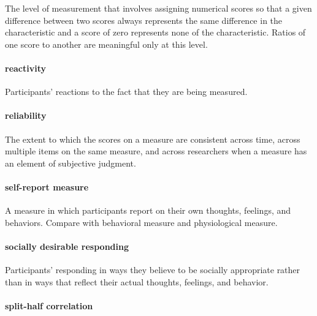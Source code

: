 \documentclass[
]{krantz}
\begin{document}
The level of measurement that involves assigning numerical scores so that a given difference between two scores always represents the same difference in the characteristic and a score of zero represents none of the characteristic. Ratios of one score to another are meaningful only at this level.

\paragraph*{reactivity}\label{reactivity}

Participants' reactions to the fact that they are being measured.

\paragraph*{reliability}\label{reliability-1}

The extent to which the scores on a measure are consistent across time, across multiple items on the same measure, and across researchers when a measure has an element of subjective judgment.

\paragraph*{self-report measure}\label{self-report-measure}

A measure in which participants report on their own thoughts, feelings, and behaviors. Compare with behavioral measure and physiological measure.

\paragraph*{socially desirable responding}\label{socially-desirable-responding}

Participants' responding in ways they believe to be socially appropriate rather than in ways that reflect their actual thoughts, feelings, and behavior.

\paragraph*{split-half correlation}\label{split-half-correlation}
\end{document}
